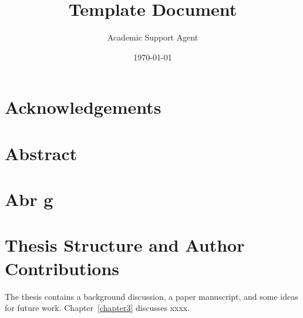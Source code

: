 \documentclass{article}
\title{Template Document}
\author{Academic Support Agent}
\date{\today}
\begin{document}
\maketitle

\maketitle

\chapter*{Acknowledgements}
\label{sec:engack}

\chapter*{Abstract}
\label{sec:engAbstract}


\chapter*{Abr g }
\label{sec:frAbstract}


\chapter*{Thesis Structure and Author Contributions}
The thesis contains a background discussion, a paper manuscript, and some ideas for future work. Chapter~\ref{chapter3} discusses xxxx. 

\label{sec:ded}













\end{document}
